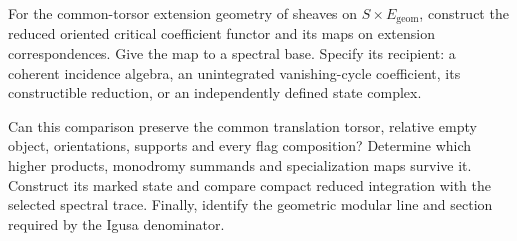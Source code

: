 \begin{question}\label{vc:vic:qn:compact-comparison}
For the common-torsor extension geometry of sheaves on
$S\times E_{\mathrm{geom}}$, construct the reduced oriented
critical coefficient functor and its maps on extension
correspondences. Give the map to a spectral base.
Specify its recipient: a coherent incidence algebra,
an unintegrated vanishing-cycle coefficient, its
constructible reduction, or an independently defined
state complex.

Can this comparison preserve the common translation torsor,
relative empty object, orientations, supports and every
flag composition? Determine which higher products,
monodromy summands and specialization maps survive it.
Construct its marked state and compare compact reduced
integration with the selected spectral trace.
Finally, identify the geometric modular line and section
required by the Igusa denominator.
\end{question}
